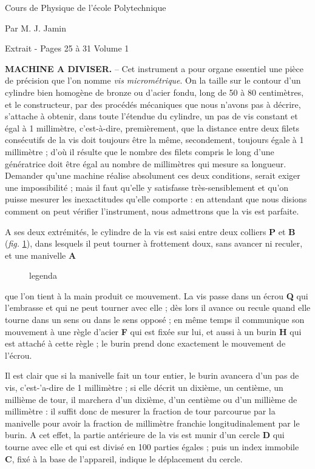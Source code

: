 \documentclass[a4paper, 12pt]{article} %
\begin{document}
Cours de Physique de l'école Polytechnique

Par M. J. Jamin

Extrait - Pages 25 à 31 Volume 1

\textbf{MACHINE A DIVISER.} -- Cet instrument a pour organe essentiel une pièce de précision que l'on nomme \textit{vis micrométrique}. On la taille sur le contour d'un cylindre bien homogène de bronze ou d'acier fondu, long de 50 à 80 centimètres, et le constructeur, par des procédés mécaniques que nous n'avons pas à décrire, s'attache à obtenir, dans toute l'étendue du cylindre, un pas de vis constant et égal à 1 millimètre, c'est-à-dire, premièrement, que la distance entre deux filets consécutifs de la vis doit toujours être la même, secondement, toujours égale à 1 millimètre ; d'où il résulte que le nombre des filets compris le long d'une génératrice doit être égal au nombre de millimètres qui mesure sa longueur. Demander qu'une machine réalise absolument ces deux conditions, serait exiger une impossibilité ; mais il faut qu'elle y satisfasse très-sensiblement et qu'on puisse mesurer les inexactitudes qu'elle comporte : en attendant que nous disions comment on peut vérifier l'instrument, nous admettrons que la vis est parfaite.

A ses deux extrémités, le cylindre de la vis est saisi entre deux colliers \textbf{P} et \textbf{B} (\textit{fig.} \ref{fig1}), dans lesquels il peut tourner à frottement doux, sans avancer ni reculer, et une manivelle \textbf{A}

\begin{figure}[H]
	\begin{center}
	\end{center}
	\caption{legenda}
	\label{fig1}
\end{figure}

que l'on tient à la main produit ce mouvement. La vis passe dans un écrou \textbf{Q} qui l'embrasse et qui ne peut tourner avec elle ; dès lors il avance ou recule quand elle tourne dans un sens ou dans le sens opposé ; en même temps il communique son mouvement à une règle d'acier \textbf{F} qui est fixée sur lui, et aussi à un burin \textbf{H} qui est attaché à cette règle ; le burin prend donc exactement le mouvement de l'écrou.

Il est clair que si la manivelle fait un tour entier, le burin avancera d'un pas de vis, c'est-'a-dire de 1 millimètre ; si elle décrit un dixième, un centième, un millième de tour, il marchera d'un dixième, d'un centième ou d'un millième de millimètre : il suffit donc de mesurer la fraction de tour parcourue par la manivelle pour avoir la fraction de millimètre franchie longitudinalement par le burin. A cet effet, la partie antérieure de la vis est munir d'un cercle \textbf{D} qui tourne avec elle et qui est divisé en 100 parties égales ; puis un index immobile \textbf{C}, fixé à la base de l'appareil, indique le déplacement du cercle.
\end{document}
